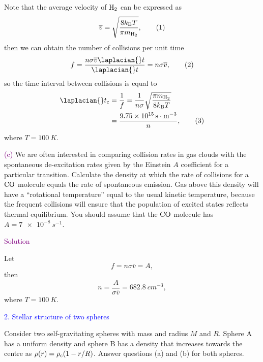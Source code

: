 \documentclass[UTF8, 12pt, a4paper, oneside, twocolumn, fontset=none]{ctexart}
\begin{document}
Note that the average velocity of $\ce{H2}$ can be expressed as
\begin{equation}
\overline{v}=\sqrt{\frac{8k_{\mathrm{B}}T}{\pi{}m_{\ce{H2}}}},\tag{1}
\end{equation}
then we can obtain the number of collisions per unit time
\begin{equation}
f=\frac{n\sigma\overline{v}\laplacian{}t}{\laplacian{}t}=n\sigma\overline{v},\tag{2}
\end{equation}
so the time interval between collisions is equal to
\begin{align}
\laplacian{}t_{\mathrm{c}}&=\frac{1}{f}=\frac{1}{n\sigma}\sqrt{\frac{\pi{}m_{\ce{H2}}}{8k_{\mathrm{B}}T}}\notag\\
&=\frac{\qty{9.75e15}{s\cdot{}m^{-3}}}{n},\tag{3}
\end{align}
where $T=\qty{100}{K}$.

\hspace*{\fill}

\noindent\textcolor{purple}{(c)} We are often interested in comparing collision rates in gas clouds with the spontaneous de-excitation rates given by the Einstein $A$ coefficient for a particular transition. Calculate the density at which the rate of collisions for a $\ce{CO}$ molecule equals the rate of spontaneous emission. Gas above this density will have a ``rotational temperature'' equal to the usual kinetic temperature, because the frequent collisions will ensure that the population of excited states reflects thermal equilibrium. You should assume that the $\ce{CO}$ molecule has $A=\qty{7e-8}{s^{-1}}$.

\hspace*{\fill}

\noindent\textcolor{purple}{Solution}

Let
\begin{equation}
f=n\sigma\overline{v}=A,\tag{1}
\end{equation}
then
\begin{equation}
n=\frac{A}{\sigma\overline{v}}=\qty{682.8}{cm^{-3}},\tag{2}
\end{equation}
where $T=\qty{100}{K}$.

\hspace*{\fill}

\noindent\textcolor{blue}{2. Stellar structure of two spheres}

\noindent Consider two self-gravitating spheres with mass and radius $M$ and $R$. Sphere A has a uniform density and sphere B has a density that increases towards the centre as $\rho\mleft(r\mright)=\rho_{\mathrm{c}}\mleft(1-r/R\mright)$. Answer questions (a) and (b) for both spheres.
\end{document}
